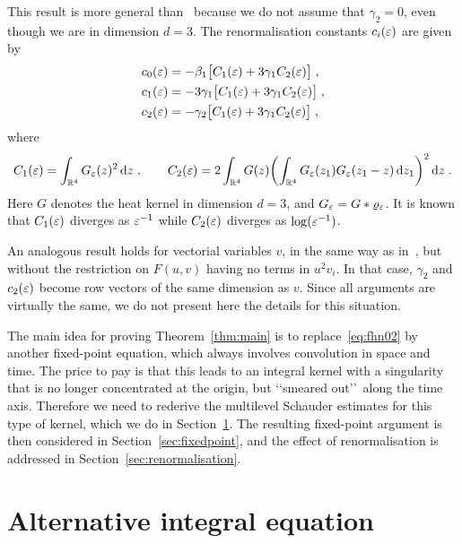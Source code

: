 \documentclass[reqno,11pt]{article}
\begin{document}
This result is more general than~\cite[Thm.~2.2]{BK2016} because we do not 
assume that $\gamma_2=0$, even though we are in dimension $d=3$. The 
renormalisation constants $c_i(\varepsilon)$ are given by 
\begin{align}
\nonumber
c_0(\eps) &= -\beta_1\bigbrak{C_1(\eps)+3\gamma_1 C_2(\eps)}\;, \\
\label{eq:c0c1c2} 
c_1(\eps) &= -3\gamma_1\bigbrak{C_1(\eps)+3\gamma_1 C_2(\eps)}\;,\\
\nonumber
c_2(\eps) &= -\gamma_2\bigbrak{C_1(\eps)+3\gamma_1 C_2(\eps)}\;,
\end{align}
where 
\begin{equation}
\label{eq:C1_C2} 
 C_1(\eps) = \int_{\R^4} G_\eps(z)^2 \6z\;, 
 \qquad 
 C_2(\eps) = 2\int_{\R^4} G(z) 
 \biggpar{\int_{\R^4} G_\eps(z_1)G_\eps(z_1-z) \6z_1}^2 \6z\;.
\end{equation} 
Here $G$ denotes the heat kernel in dimension $d=3$, and $G_\varepsilon = 
G*\varrho_\varepsilon$. It is known that $C_1(\varepsilon)$ diverges as $\varepsilon^{-1}$ while 
$C_2(\varepsilon)$ diverges as $\log(\varepsilon^{-1})$. 

An analogous result holds for vectorial variables $v$, in the same way as 
in~\cite[Thm.~2.3]{BK2016}, but without the restriction on $F(u,v)$ having no 
terms in $u^2 v_i$. In that case, $\gamma_2$ and $c_2(\varepsilon)$ become row 
vectors of the same dimension as $v$. Since all arguments are virtually the 
same, we do not present here the details for this situation. 

The main idea  for proving Theorem~\ref{thm:main} is to 
replace~\eqref{eq:fhn02} by another fixed-point equation, which always involves 
convolution in space and time. The price to pay is that this leads to an 
integral kernel with a singularity that is no longer concentrated at the 
origin, but \lq\lq smeared out\rq\rq\ along the time axis. Therefore we need to 
rederive the multilevel Schauder estimates for this type of kernel, which we do 
in Section~\ref{sec:Schauder}. The resulting fixed-point argument is then 
considered in Section~\ref{sec:fixedpoint}, and the effect of renormalisation 
is addressed in Section~\ref{sec:renormalisation}. 


\section{Alternative integral equation}
\label{sec:Schauder} 
\end{document}
